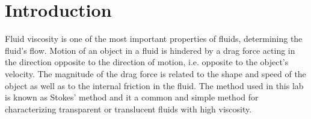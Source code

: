 \section{Introduction}
Fluid viscosity is one of the most important properties of fluids, determining the fluid’s flow.
Motion of an object in a fluid is hindered by a drag force acting in the direction opposite to the direction of motion, i.e. opposite to the object’s velocity. 
The magnitude of the drag force is related to the shape and speed of the object as well as to the internal friction in the fluid.
The method used in this lab is known as Stokes’ method and it a common and simple method for characterizing transparent or translucent fluids with high viscosity.

